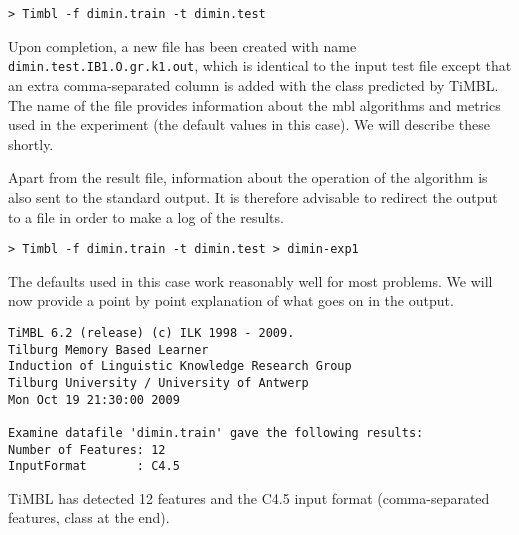 \documentclass{report}
\begin{document}
{\footnotesize
\begin{verbatim}
> Timbl -f dimin.train -t dimin.test
\end{verbatim}
}

Upon completion, a new file has been created with name {\small\tt
dimin.test.IB1.O.gr.k1.out}, which is identical to the
input test file except that an extra comma-separated column is added
with the class predicted by TiMBL. The name of the file provides
information about the {\sc mbl} algorithms and metrics used in the
experiment (the default values in this case). We will describe these
shortly.

Apart from the result file, information about the operation of the
algorithm is also sent to the standard output. It is therefore 
advisable to redirect the output to a file in order to make a log of
the results.

{\footnotesize
\begin{verbatim}
> Timbl -f dimin.train -t dimin.test > dimin-exp1
\end{verbatim}
}

The defaults used in this case work reasonably well for most problems.  We
will now provide a point by point explanation of what goes on in the
output.



{\footnotesize
\begin{verbatim}
TiMBL 6.2 (release) (c) ILK 1998 - 2009.
Tilburg Memory Based Learner
Induction of Linguistic Knowledge Research Group
Tilburg University / University of Antwerp
Mon Oct 19 21:30:00 2009

Examine datafile 'dimin.train' gave the following results:
Number of Features: 12
InputFormat       : C4.5
\end{verbatim}
}



TiMBL has detected 12 features and the C4.5 input format
(comma-separated features, class at the end).

\end{document}
